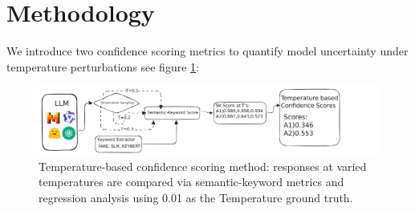 \documentclass[sigconf]{acmart}
\begin{document}
\section{Methodology}

We introduce two confidence scoring metrics to quantify model uncertainty under temperature perturbations see figure \ref{fig:main_approach}:


\begin{figure}[ht]
    \centering
    \includegraphics[width=\columnwidth]{images/Main-approach.pdf}
    \caption{Temperature-based confidence scoring method: responses at varied temperatures are compared via semantic-keyword metrics and regression analysis using 0.01 as the Temperature ground truth.}
    \label{fig:main_approach}
\end{figure}
\end{document}
